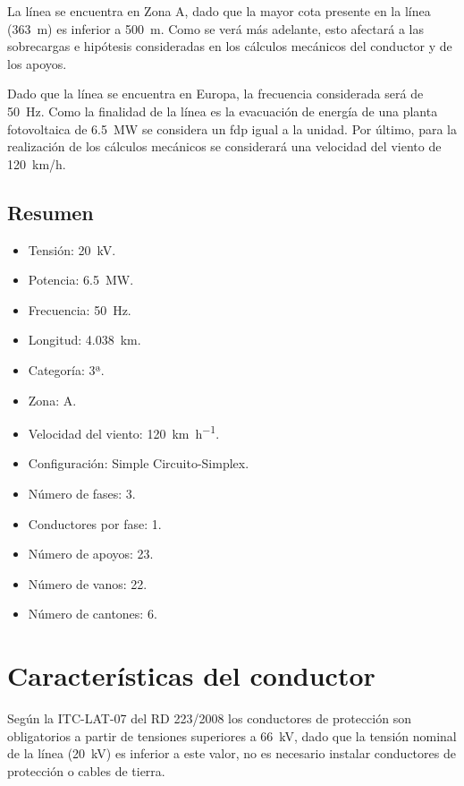 La línea se encuentra en Zona A, dado que la mayor cota presente en la línea (\SI{363}{m}) es inferior a \SI{500}{m}. Como se verá más adelante, esto afectará a las sobrecargas e hipótesis consideradas en los cálculos mecánicos del conductor y de los apoyos.

Dado que la línea se encuentra en Europa, la frecuencia considerada será de \SI{50}{Hz}. Como la finalidad de la línea es la evacuación de energía de una planta fotovoltaica de \SI{6.5}{MW} se considera un \ac{fdp} igual a la unidad. Por último, para la realización de los cálculos mecánicos se considerará una velocidad del viento de \SI{120}{km/h}.
\clearpage
    \subsection{Resumen}
    \label{subsec:md-características}
    \begin{itemize}
  \item Tensión: \SI{20}{kV}.
  \item Potencia: \SI{6.5}{MW}.
  \item Frecuencia: \SI{50}{Hz}.
  \item Longitud: \SI{4.038}{km}.
  \item Categoría: 3ª.
  \item Zona: A.
  \item Velocidad del viento: \SI{120}{\kilo\meter\per\hour}.
  \item Configuración: Simple Circuito-Simplex.
  \item Número de fases: 3.
  \item Conductores por fase: 1.
  \item Número de apoyos: 23.
  \item Número de vanos: 22.
  \item Número de cantones: 6.
\end{itemize}

\clearpage
\section{Características del conductor}
\label{sec:md-conductor}
Según la ITC-LAT-07 del RD 223/2008 los conductores de protección son obligatorios a partir de tensiones superiores a \SI{66}{kV}, dado que la tensión nominal de la línea (\SI{20}{kV}) es inferior a este valor, no es necesario instalar conductores de protección o cables de tierra. 

